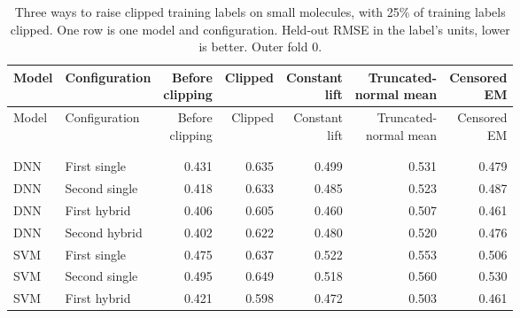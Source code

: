 \label{app:add:noise_censoring_moves}
{%
\begin{longtable}{@{}llrrrrr@{}}
\toprule
Model & Configuration & \makecell[r]{Before\\clipping} & Clipped & \makecell[r]{Constant\\lift} & \makecell[r]{Truncated-\\normal mean} & \makecell[r]{Censored\\EM} \\
\midrule
\endfirsthead
\toprule
Model & Configuration & \makecell[r]{Before\\clipping} & Clipped & \makecell[r]{Constant\\lift} & \makecell[r]{Truncated-\\normal mean} & \makecell[r]{Censored\\EM} \\
\midrule
\endhead
\bottomrule
\caption[Three ways to raise clipped labels: small molecules.]{Three ways to raise clipped training labels on small molecules, with 25\% of training labels clipped. One row is one model and configuration. Held-out RMSE in the label's units, lower is better. Outer fold 0.}
\label{tab:noise:res:censoring_moves}\\
\endlastfoot
\multicolumn{7}{@{}l}{\textit{LogD}} \\
DNN & First single & 0.431 & 0.635 & 0.499 & 0.531 & 0.479 \\
DNN & Second single & 0.418 & 0.633 & 0.485 & 0.523 & 0.487 \\
DNN & First hybrid & 0.406 & 0.605 & 0.460 & 0.507 & 0.461 \\
DNN & Second hybrid & 0.402 & 0.622 & 0.480 & 0.520 & 0.476 \\
SVM & First single & 0.475 & 0.637 & 0.522 & 0.553 & 0.506 \\
SVM & Second single & 0.495 & 0.649 & 0.518 & 0.560 & 0.530 \\
SVM & First hybrid & 0.421 & 0.598 & 0.472 & 0.503 & 0.461 \\

\end{longtable}}
